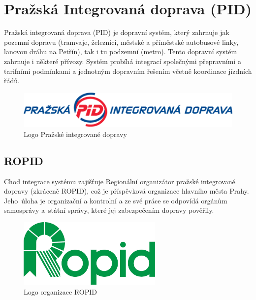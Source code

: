 \chapter{Pražská Integrovaná doprava (PID)}
\label{3-teorie-pid}

Pražská integrovaná doprava (PID) je dopravní systém, který zahrnuje jak pozemní
dopravu (tramvaje, železnici, městské a příměstské autobusové linky, lanovou dráhu na Petřín),
tak i tu podzemní (metro). Tento dopravní systém zahrnuje i některé přívozy. 
Systém probíhá integrací společnými přepravními a tarifními podmínkami a jednotným dopravním řešením včetně 
koordinace jízdních řádů. \cite{pid}
\vskip 0.2in
 
\begin{figure}[H] \centering
    \includegraphics[width=400pt]{./pictures/pid-logo.png}
    \caption[Logo Pražské integrované dopravy]{Logo Pražské integrované dopravy \cite{pid}}
	\label{fig:pid-logo}                                
\end{figure} 

\section{ROPID}

Chod integrace systému zajišťuje Regionální organizátor pražské integrované dopravy (zkráceně ROPID),
což je příspěvková organizace hlavního města Prahy. Jeho~úloha je organizační a kontrolní
a ze své práce se odpovídá orgánům samosprávy a~státní správy, které jej zabezpečením dopravy pověřily.

\begin{figure}[H] \centering
    \includegraphics[width=200pt]{./pictures/ropid-logo.jpg}
    \caption[Logo organizace ROPID]{Logo organizace ROPID \cite{pid}}
	\label{fig:ropid-logo}                                
\end{figure}

